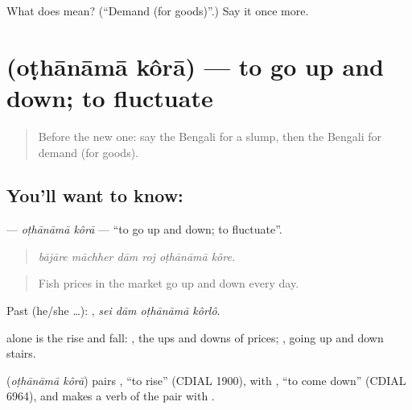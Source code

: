 \begin{tcolorbox}[breakable,colback=teal!4,colframe=teal!35!black,title={Before you move on}]
What does  mean? (\textquotedblleft{}Demand (for goods)\textquotedblright{}.) Say it once more.
\end{tcolorbox}
\section[\texorpdfstring{\bn{ওঠানামা} \bn{করা} (oṭhānāmā kôrā)}{ওঠানামা করা (oṭhānāmā kôrā)}]{  (oṭhānāmā kôrā) — to go up and down; to fluctuate}

\label{lesson:BN-C424-othanama-kora}



\begin{quote}
Before the new one: say the Bengali for a slump, then the Bengali for demand (for goods).
\end{quote}

\subsection*{You'll want to know:  }
\textbf{ } — \emph{oṭhānāmā kôrā} — \textquotedblleft{}to go up and down; to fluctuate\textquotedblright{}.

\begin{quote}
     
\end{quote}

\begin{quote}
\emph{bājāre māchher dām roj oṭhānāmā kôre.}
\end{quote}

\begin{quote}
Fish prices in the market go up and down every day.
\end{quote}

Past (he/she …):    , \emph{sei dām oṭhānāmā kôrlô}.

 alone is the rise and fall:  , the ups and downs of prices;  , going up and down stairs.

\begin{cousinweb}
\textbf{ } (\emph{oṭhānāmā kôrā}) pairs \textbf{}, \textquotedblleft{}to rise\textquotedblright{} (CDIAL 1900), with \textbf{}, \textquotedblleft{}to come down\textquotedblright{} (CDIAL 6964), and makes a verb of the pair with .
\end{cousinweb}

